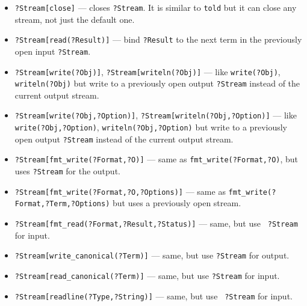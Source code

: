 \documentclass[11pt]{article}
\begin{document}
\begin{itemize}
  One way to think of 
  \texttt{?Filename[open(read,?Stream)]} is that it is
  like \texttt{see(?Filename)}
  followed by \texttt{seeing(?Stream)}. Similarly,
  \texttt{?Filename[open(write,?Stream)]} 
  is like \texttt{tell(?Filename)} followed by \texttt{telling(?Stream)}.
  But \texttt{open} provides one more option, \texttt{append}, which does not
  exist in stream-based I/O, plus the binary modes for Windows.
\item {\tt ?Stream[close]} --- closes {\tt ?Stream}. It is similar to
  \texttt{told} but it can close any stream, not just the default one. 
\item {\tt ?Stream[read(?Result)]} --- bind {\tt ?Result} to the next term
  in the previously open input {\tt ?Stream}.
\item {\tt ?Stream[write(?Obj)]}, \texttt{?Stream[writeln(?Obj)]} --- like 
  \texttt{write(?Obj)}, \texttt{writeln(?Obj)} but write to a
  previously open output {\tt ?Stream} instead of the current output
  stream.
\item {\tt ?Stream[write(?Obj,?Option)]}, \texttt{?Stream[writeln(?Obj,?Option)]} --- like 
  \texttt{write(?Obj,?Option)}, \texttt{writeln(?Obj,?Option)} but write to a
  previously open output {\tt ?Stream} instead of the current output
  stream.
\item {\tt ?Stream[fmt\_write(?Format,?O)]} --- same as
  \texttt{fmt\_write(?Format,?O)}, but uses {\tt ?Stream} for the
  output. 
\item {\tt ?Stream[fmt\_write(?Format,?O,?Options)]} --- same as
  \texttt{fmt\_write(?Format,?Term,?Options)} but uses a previously open
  stream.
\item {\tt ?Stream[fmt\_read(?Format,?Result,?Status)]}  ---  same, but use {\tt
    ?Stream} for input.
\item {\tt ?Stream[write\_canonical(?Term)]} --- same, but use {\tt ?Stream} for
  output.
\item {\tt ?Stream[read\_canonical(?Term)]} --- same, but use {\tt ?Stream} for
  input.
\item {\tt ?Stream[readline(?Type,?String)]} --- same, but use {\tt
    ?Stream} for input.
\end{itemize}
\end{document}
